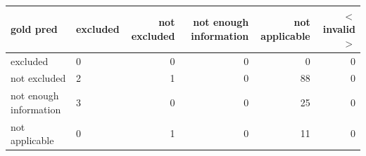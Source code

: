 \begin{tabular}{llrrrr}
\toprule
gold  pred & excluded & not excluded & not enough information & not applicable & $<$invalid$>$ \\
\midrule
excluded & 0 & 0 & 0 & 0 & 0 \\
not excluded & 2 & 1 & 0 & 88 & 0 \\
not enough information & 3 & 0 & 0 & 25 & 0 \\
not applicable & 0 & 1 & 0 & 11 & 0 \\
\bottomrule
\end{tabular}

